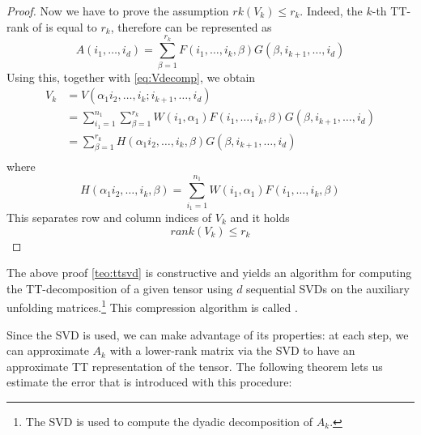 \begin{Teo}
\begin{proof}
    Now we have to prove the assumption $rk(V_k) \leq r_k$. Indeed, the $k$-th TT-rank of \A is equal to $r_k$, therefore \A can be represented as
    \begin{equation*}
      A(i_1,\ldots,i_d) = \sum_{\beta=1}^{r_k} F(i_1,\ldots,i_k,\beta) G(\beta,i_{k+1},\ldots,i_d)
    \end{equation*}
    Using this, together with \ref{eq:Vdecomp}, we obtain
    \begin{align*}
      V_k &= V(\alpha_1 i_2,\ldots,i_k;i_{k+1},\ldots,i_d) \\
      &= \sum_{i_1 = 1}^{n_1} \sum_{\beta = 1}^{r_k} W(i_1, \alpha_1) F(i_1,\ldots,i_k,\beta) G(\beta,i_{k+1},\ldots,i_d) \\
      &= \sum_{\beta = 1}^{r_k} H(\alpha_1 i_2,\ldots,i_k,\beta) G(\beta,i_{k+1},\ldots,i_d) \\
    \end{align*}
    where
    \begin{equation*}
      H(\alpha_1 i_2,\ldots,i_k,\beta) = \sum_{i_1 = 1}^{n_1} W(i_1, \alpha_1) F(i_1,\ldots,i_k,\beta)
    \end{equation*}
    This separates row and column indices of $V_k$ and it holds
    \begin{equation*}
      rank(V_k) \leq r_k
    \end{equation*}
  \end{proof}
  
\end{Teo}

The above proof \ref{teo:ttsvd} is constructive and yields an algorithm for computing the TT-decomposition of a given tensor using $d$ sequential SVDs on the auxiliary unfolding matrices.\footnote{The SVD is used to compute the dyadic decomposition of $A_k$.} This  compression algorithm is called .

Since the SVD is used, we can make advantage of its properties: at each step, we can approximate $A_k$ with a lower-rank matrix via the SVD to have an approximate TT representation of the tensor. The following theorem lets us estimate the error that is introduced with this procedure:

